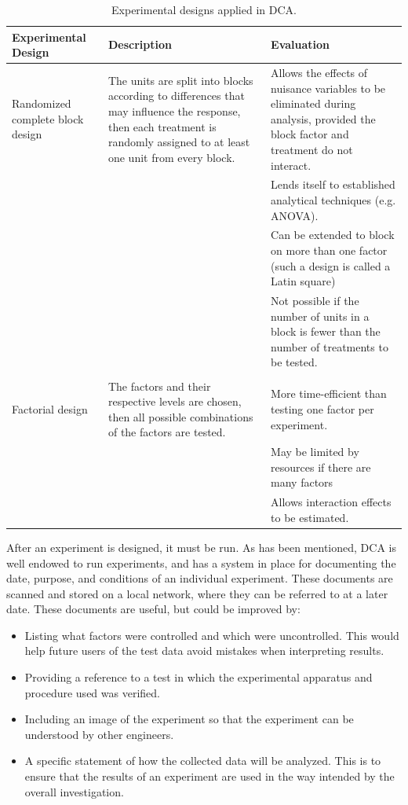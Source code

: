 \documentclass[11pt,a4paper,article]{memoir} %
\begin{document}
\renewcommand\arraystretch{1.5}
\begin{table}[H]
\hspace*{-2.25cm}
\small
\centering
	\begin{tabular}{p{3.5cm} p{6cm} p{6.5cm}}
	\toprule
	\textbf{Experimental Design} 		& 	\textbf{Description}	&	\textbf{Evaluation} \\\toprule
	Randomized complete block design	 & 	The units are split into blocks according to differences that may influence the response, then each treatment is randomly assigned to at least one unit from every block. &  Allows the effects of nuisance variables to be eliminated during analysis, provided the block factor and treatment do not interact. \\
	& & Lends itself to established analytical techniques (e.g. ANOVA). \\
	& & Can be extended to block on more than one factor (such a design is called a Latin square) \\
	& & Not possible if the number of units in a block is fewer than the number of treatments to be tested. \\
	&&\\
	Factorial design & The factors and their respective levels are chosen, then all possible combinations of the factors are tested. & More time-efficient than testing one factor per experiment. \\
	& &  May be limited by resources if there are many factors \\
	& & Allows interaction effects to be estimated.
	\\\bottomrule
	\end{tabular}
	\hspace*{-2.25cm}
	\caption{Experimental designs applied in DCA.}
	\label{tab:exp_designs}
\end{table}

After an experiment is designed, it must be run. As has been mentioned, DCA is well endowed to run experiments, and has a system in place for documenting the date, purpose, and conditions of an individual experiment. These documents are scanned and stored on a local network, where they can be referred to at a later date. These documents are useful, but could be improved by:
\begin{itemize}
	\item Listing what factors were controlled and which were uncontrolled. This would help future users of the test data avoid mistakes when interpreting results.
	\item Providing a reference to a test in which the experimental apparatus and procedure used was verified.
	\item Including an image of the experiment so that the experiment can be understood by other engineers.
	\item A specific statement of how the collected data will be analyzed. This is to ensure that the results of an experiment are used in the way intended by the overall investigation.
\end{itemize}
\end{document}
